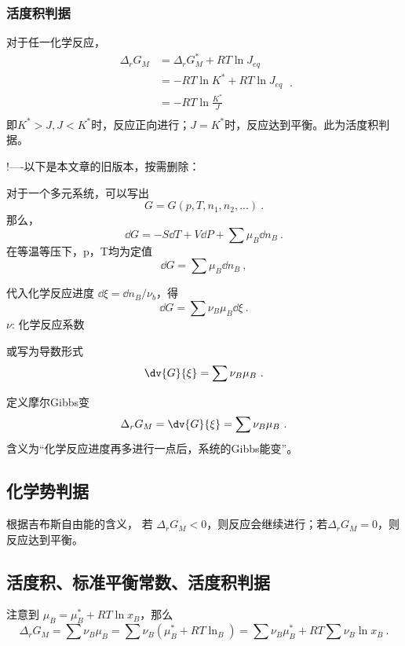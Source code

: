 \subsubsection{活度积判据}
对于任一化学反应，
$$
\begin{aligned}
\Delta_r G_M & = \Delta_r G_M^* + RT \ln J_{eq}\\
& = - RT \ln K^* + RT \ln J_{eq}\\
& = - RT \ln \frac{K^*}{J} \\
\end{aligned}~.
$$
即$K^*>J, J<K^*$时，反应正向进行；$J=K^*$时，反应达到平衡。此为活度积判据。


!----以下是本文章的旧版本，按需删除：

对于一个多元系统，可以写出
\begin{equation}
G=G(p,T,n_1,n_2,...)~.
\end{equation}
那么，
\begin{equation}
\dd G=-S \dd T +V \dd P + \sum \mu_B \dd n_B~.
\end{equation}
在等温等压下，p，T均为定值
\begin{equation}
\dd G=\sum \mu_B \dd n_B~,
\end{equation}

代入化学反应进度 $\dd \xi=\dd n_B/\nu_b$，得
\begin{equation}
\dd G=\sum \nu_B \mu_B \dd \xi~.
\end{equation}
$\nu$: 化学反应系数

或写为导数形式
\begin{equation}
\dv{G}{\xi}=\sum \nu_B \mu_B~.
\end{equation}

定义摩尔Gibbs变
\begin{equation}
\Delta _r G_M = \dv{G}{\xi}=\sum \nu_B \mu_B~.
\end{equation}
含义为“化学反应进度再多进行一点后，系统的Gibbs能变”。

\subsection{化学势判据}
根据吉布斯自由能的含义，
若 $\Delta _r G_M<0$，则反应会继续进行；若$\Delta _r G_M = 0$，则反应达到平衡。

\subsection{活度积、标准平衡常数、活度积判据}
注意到 
$\mu_B=\mu_B^*+RT \ln x_B$，那么
\begin{equation} \label{eq_chemBl_1}
\Delta _r G_M =\sum \nu_B \mu_B = \sum \nu_B (\mu_B^*+RT\ln _B)=\sum \nu_B \mu_B^* + RT \sum \nu_B \ln x_B~.
\end{equation}

